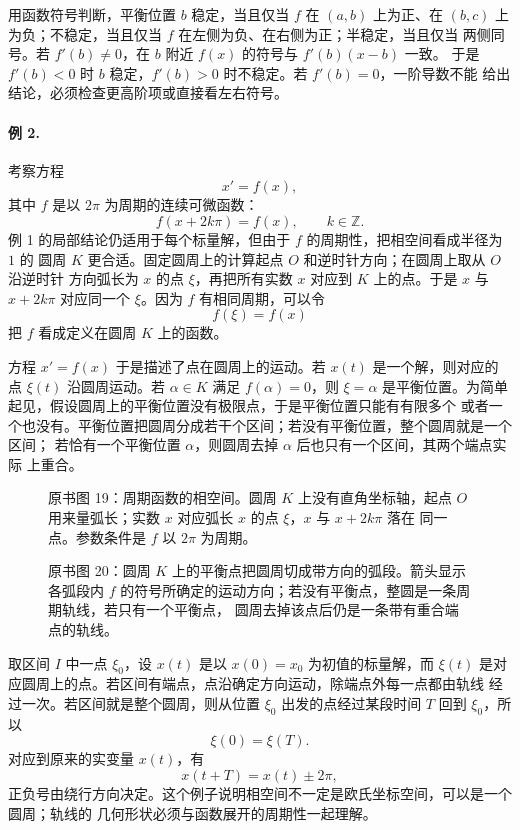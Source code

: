 用函数符号判断，平衡位置 \(b\) 稳定，当且仅当 \(f\) 在 \((a,b)\) 上为正、在
\((b,c)\) 上为负；不稳定，当且仅当 \(f\) 在左侧为负、在右侧为正；半稳定，当且仅当
两侧同号。若 \(f'(b)\neq0\)，在 \(b\) 附近 \(f(x)\) 的符号与 \(f'(b)(x-b)\) 一致。
于是 \(f'(b)<0\) 时 \(b\) 稳定，\(f'(b)>0\) 时不稳定。若 \(f'(b)=0\)，一阶导数不能
给出结论，必须检查更高阶项或直接看左右符号。

\paragraph{例 2.}
考察方程
\begin{equation}
 x'=f(x),
 \tag{19}
\end{equation}
其中 \(f\) 是以 \(2\pi\) 为周期的连续可微函数：
\[
 f(x+2k\pi)=f(x),\qquad k\in\mathbb Z.
\]
例 1 的局部结论仍适用于每个标量解，但由于 \(f\) 的周期性，把相空间看成半径为 \(1\) 的
圆周 \(K\) 更合适。固定圆周上的计算起点 \(O\) 和逆时针方向；在圆周上取从 \(O\) 沿逆时针
方向弧长为 \(x\) 的点 \(\xi\)，再把所有实数 \(x\) 对应到 \(K\) 上的点。于是 \(x\) 与
\(x+2k\pi\) 对应同一个 \(\xi\)。因为 \(f\) 有相同周期，可以令
\[
 f(\xi)=f(x)
\]
把 \(f\) 看成定义在圆周 \(K\) 上的函数。

方程 \(x'=f(x)\) 于是描述了点在圆周上的运动。若 \(x(t)\) 是一个解，则对应的点
\(\xi(t)\) 沿圆周运动。若 \(\alpha\in K\) 满足 \(f(\alpha)=0\)，则 \(\xi=\alpha\)
是平衡位置。为简单起见，假设圆周上的平衡位置没有极限点，于是平衡位置只能有有限多个
或者一个也没有。平衡位置把圆周分成若干个区间；若没有平衡位置，整个圆周就是一个区间；
若恰有一个平衡位置 \(\alpha\)，则圆周去掉 \(\alpha\) 后也只有一个区间，其两个端点实际
上重合。

\begin{figure}[H]
 \centering
 
 \caption{原书图 19：周期函数的相空间。圆周 \(K\) 上没有直角坐标轴，起点 \(O\)
 用来量弧长；实数 \(x\) 对应弧长 \(x\) 的点 \(\xi\)，\(x\) 与 \(x+2k\pi\) 落在
 同一点。参数条件是 \(f\) 以 \(2\pi\) 为周期。}
 \label{fig:ch2-p2-19}
\end{figure}

\begin{figure}[H]
 \centering
 
 \caption{原书图 20：圆周 \(K\) 上的平衡点把圆周切成带方向的弧段。箭头显示各弧段内
 \(f\) 的符号所确定的运动方向；若没有平衡点，整圆是一条周期轨线，若只有一个平衡点，
 圆周去掉该点后仍是一条带有重合端点的轨线。}
 \label{fig:ch2-p2-20}
\end{figure}

取区间 \(I\) 中一点 \(\xi_0\)，设 \(x(t)\) 是以 \(x(0)=x_0\) 为初值的标量解，而
\(\xi(t)\) 是对应圆周上的点。若区间有端点，点沿确定方向运动，除端点外每一点都由轨线
经过一次。若区间就是整个圆周，则从位置 \(\xi_0\) 出发的点经过某段时间 \(T\) 回到
\(\xi_0\)，所以
\[
 \xi(0)=\xi(T).
\]
对应到原来的实变量 \(x(t)\)，有
\[
 x(t+T)=x(t)\pm2\pi,
\]
正负号由绕行方向决定。这个例子说明相空间不一定是欧氏坐标空间，可以是一个圆周；轨线的
几何形状必须与函数展开的周期性一起理解。

